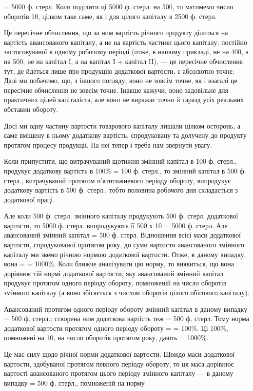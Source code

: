 \parcont{}  %
 = 5000 ф. стерл. Коли поділити ці 5000 ф. стерл. на 500, то матимемо число оборотів 10,
цілком таке саме, як і для цілого капіталу в 2500 ф. стерл.

Це пересічне обчислення, що за ним вартість річного продукту ділиться на вартість авансованого
капіталу, а не на вартість частини цього капіталу, постійно застосовуваної в одному робочому періоді
(отже, в нашому прикладі, не на 400, а на 500, не на капітал І, а на капітал І + капітал II), — це
пересічне обчислення тут, де йдеться лише про продукцію додаткової вартости, є абсолютно точне. Далі
ми побачимо, що, з іншого погляду, воно не зовсім точне, як і взагалі це пересічне обчислення не
зовсім точне. Інакше кажучи, воно задовільне для практичних цілей капіталіста,
але воно не виражає точно й гаразд усіх реальних обставин обороту.

Досі ми одну частину вартости товарового капіталу лишали цілком осторонь, а саме вміщену в ньому
додаткову вартість, спродуковану та долучену до продукту протягом процесу продукції. На неї тепер і
треба нам звернути увагу.

Коли припустити, що витрачуваний щотижня змінний капітал в 100 ф. стерл., продукує додаткову
вартість в 100\% = 100 ф. стерл., то змінний капітал в 500 ф. стерл.,  витрачуваний протягом
п’ятитижневого періоду обороту, випродукує додаткову вартість в 500 ф. стерл., тобто половина
робочого дня складається з додаткової праці.

Але коли 500 ф. стерл. змінного капіталу продукують 500 ф. стерл. додаткової вартости, то 5000 ф.
стерл. випродукують її 500 х 10 = 5000 ф. стерл. Але авансований змінний капітал = 500 ф. стерл.
Відношення всієї маси додаткової вартости, спродукованої протягом року, до суми вартости
авансованого змінного капіталу ми звемо річною нормою додаткової вартости. Отже, в даному випадку,
вона =  = 1000\%.
Коли ближче аналізувати цю норму, то виявиться, що вона дорівнює тій нормі додаткової вартости, яку
авансований змінний капітал продукує протягом одного періоду обороту, помноженій на число оборотів
змінного капіталу (а воно збігається з числом оборотів цілого обігового капіталу).

Авансований протягом одного періоду обороту змінний капітал в даному випадку = 500 ф. стерл.;
створена ним додаткова вартість теж = 500 ф. стерл. Тому норма додаткової вартости протягом одного
періоду обороту =  = 100\%. Ці 100\%, помножені на 10, на число оборотів протягом року,
дають  = 1000\%.

Це має силу щодо річної норми додаткової вартости. Щождо маси додаткової вартости, здобуваної
протягом певного періоду обороту, то ця маса дорівнює вартості авансованого протягом цього періоду
змінного капіталу — в даному випадку = 500 ф. стерл., помноженій на норму
\parbreak{}  %
